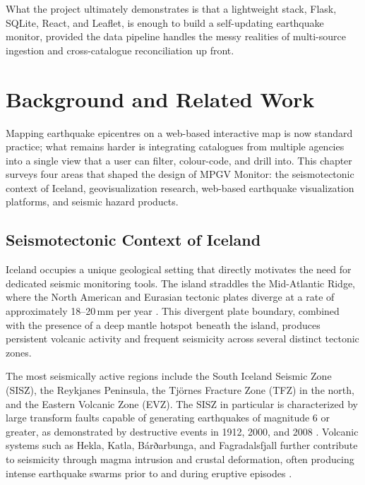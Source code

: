 \documentclass[12pt]{article}
\begin{document}
What the project ultimately demonstrates is that a lightweight stack, Flask, SQLite, React, and Leaflet, is enough to build a self-updating earthquake monitor, provided the data pipeline handles the messy realities of multi-source ingestion and cross-catalogue reconciliation up front.

\newpage


\section{Background and Related Work}

Mapping earthquake epicentres on a web-based interactive map is now standard practice; what remains harder is integrating catalogues from multiple agencies into a single view that a user can filter, colour-code, and drill into. This chapter surveys four areas that shaped the design of MPGV Monitor: the seismotectonic context of Iceland, geovisualization research, web-based earthquake visualization platforms, and seismic hazard products.

\subsection{Seismotectonic Context of Iceland}

Iceland occupies a unique geological setting that directly motivates the need for dedicated seismic monitoring tools. The island straddles the Mid-Atlantic Ridge, where the North American and Eurasian tectonic plates diverge at a rate of approximately 18--20\,mm per year \cite{Sigmundsson2006}. This divergent plate boundary, combined with the presence of a deep mantle hotspot beneath the island, produces persistent volcanic activity and frequent seismicity across several distinct tectonic zones.

The most seismically active regions include the South Iceland Seismic Zone (SISZ), the Reykjanes Peninsula, the Tjörnes Fracture Zone (TFZ) in the north, and the Eastern Volcanic Zone (EVZ). The SISZ in particular is characterized by large transform faults capable of generating earthquakes of magnitude 6 or greater, as demonstrated by destructive events in 1912, 2000, and 2008 \cite{Jakobsdottir2008}. Volcanic systems such as Hekla, Katla, Bárðarbunga, and Fagradalsfjall further contribute to seismicity through magma intrusion and crustal deformation, often producing intense earthquake swarms prior to and during eruptive episodes \cite{Sigmundsson2006}.
\end{document}
